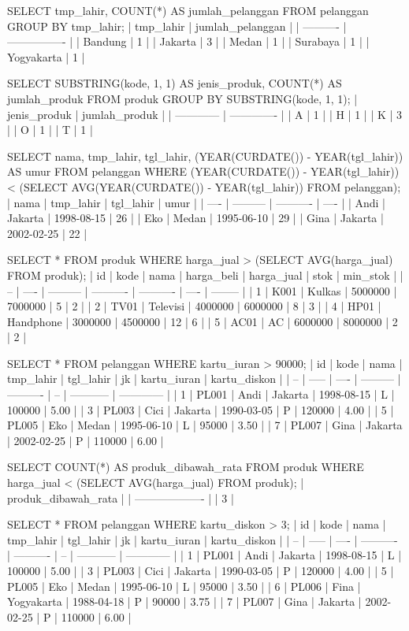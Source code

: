 SELECT tmp_lahir, COUNT(*) AS jumlah_pelanggan FROM pelanggan GROUP BY tmp_lahir;
| tmp_lahir  | jumlah_pelanggan |
| ---------- | ---------------- |
| Bandung    | 1                |
| Jakarta    | 3                |
| Medan      | 1                |
| Surabaya   | 1                |
| Yogyakarta | 1                |

SELECT SUBSTRING(kode, 1, 1) AS jenis_produk, COUNT(*) AS jumlah_produk 
FROM produk 
GROUP BY SUBSTRING(kode, 1, 1);
| jenis_produk | jumlah_produk |
| ------------ | ------------- |
| A            | 1             |
| H            | 1             |
| K            | 3             |
| O            | 1             |
| T            | 1             |

SELECT nama, tmp_lahir, tgl_lahir, (YEAR(CURDATE()) - YEAR(tgl_lahir)) AS umur
FROM pelanggan
WHERE (YEAR(CURDATE()) - YEAR(tgl_lahir)) < (SELECT AVG(YEAR(CURDATE()) - YEAR(tgl_lahir)) FROM pelanggan);
| nama | tmp_lahir | tgl_lahir  | umur |
| ---- | --------- | ---------- | ---- |
| Andi | Jakarta   | 1998-08-15 | 26   |
| Eko  | Medan     | 1995-06-10 | 29   |
| Gina | Jakarta   | 2002-02-25 | 22   |

SELECT * FROM produk WHERE harga_jual > (SELECT AVG(harga_jual) FROM produk);
| id | kode | nama      | harga_beli | harga_jual | stok | min_stok |
| -- | ---- | --------- | ---------- | ---------- | ---- | -------- |
| 1  | K001 | Kulkas    | 5000000    | 7000000    | 5    | 2        |
| 2  | TV01 | Televisi  | 4000000    | 6000000    | 8    | 3        |
| 4  | HP01 | Handphone | 3000000    | 4500000    | 12   | 6        |
| 5  | AC01 | AC        | 6000000    | 8000000    | 2    | 2        |

SELECT * FROM pelanggan WHERE kartu_iuran > 90000;
| id | kode  | nama | tmp_lahir | tgl_lahir  | jk | kartu_iuran | kartu_diskon |
| -- | ----- | ---- | --------- | ---------- | -- | ----------- | ------------ |
| 1  | PL001 | Andi | Jakarta   | 1998-08-15 | L  | 100000      | 5.00         |
| 3  | PL003 | Cici | Jakarta   | 1990-03-05 | P  | 120000      | 4.00         |
| 5  | PL005 | Eko  | Medan     | 1995-06-10 | L  | 95000       | 3.50         |
| 7  | PL007 | Gina | Jakarta   | 2002-02-25 | P  | 110000      | 6.00         |

SELECT COUNT(*) AS produk_dibawah_rata 
FROM produk 
WHERE harga_jual < (SELECT AVG(harga_jual) FROM produk);
| produk_dibawah_rata |
| ------------------- |
| 3                   |

SELECT * FROM pelanggan WHERE kartu_diskon > 3;
| id | kode  | nama | tmp_lahir  | tgl_lahir  | jk | kartu_iuran | kartu_diskon |
| -- | ----- | ---- | ---------- | ---------- | -- | ----------- | ------------ |
| 1  | PL001 | Andi | Jakarta    | 1998-08-15 | L  | 100000      | 5.00         |
| 3  | PL003 | Cici | Jakarta    | 1990-03-05 | P  | 120000      | 4.00         |
| 5  | PL005 | Eko  | Medan      | 1995-06-10 | L  | 95000       | 3.50         |
| 6  | PL006 | Fina | Yogyakarta | 1988-04-18 | P  | 90000       | 3.75         |
| 7  | PL007 | Gina | Jakarta    | 2002-02-25 | P  | 110000      | 6.00         |
